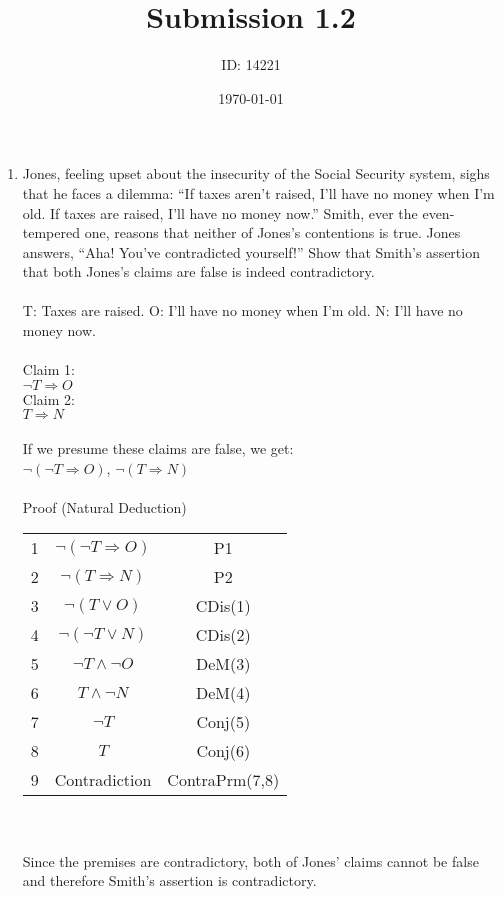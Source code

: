 \documentclass[]{article}
\date{\today}
\author{ID: 14221}
\title{Submission 1.2}
\begin{document}
\maketitle

\begin{enumerate}
    \item Jones, feeling upset about the insecurity of the Social Security system, sighs that he faces a dilemma: “If taxes aren’t raised, I’ll have no money when I’m old. If taxes are raised, I’ll have no money now.” Smith, ever the even-tempered one, reasons that neither of Jones’s contentions is true. Jones answers, “Aha! You’ve contradicted yourself!” Show that Smith’s assertion that both Jones’s claims are false is indeed contradictory.
    \\\\T: Taxes are raised.
    \newline O: I'll have no money when I'm old.
    \newline N: I'll have no money now.
    \\\\ Claim 1:
    \\ $\neg T \Rightarrow O$
    \\ Claim 2:
    \\ $T \Rightarrow N$
    \\\\If we presume these claims are false, we get:
    \\ $ \neg(\neg T \Rightarrow O)$, $\neg (T \Rightarrow N)$
    \\\\ Proof (Natural Deduction)
    \begin{tabular}{c| c | c}
        1 & $ \neg(\neg T \Rightarrow O)$ & P1 \\
        2 & $\neg (T \Rightarrow N)$ & P2 \\
        3 & $\neg(T \lor O)$ & CDis(1) \\
        4 & $\neg(\neg T \lor N)$ & CDis(2) \\
        5 & $\neg T \land \neg O$ & DeM(3) \\
        6 & $T \land \neg N$ & DeM(4) \\
        7 & $\neg T$ & Conj(5) \\
        8 & $T$ & Conj(6) \\
        9 & Contradiction & ContraPrm(7,8)
    \end{tabular}
    \\\\Since the premises are contradictory, both of Jones' claims cannot be false and therefore Smith's assertion is contradictory.
    

\end{enumerate}
\end{document}
